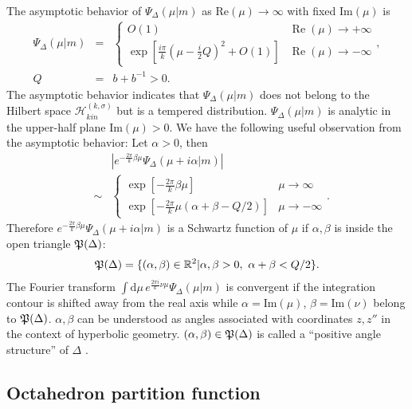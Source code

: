 \documentclass[aps,prd,notitlepage,nofootinbib,superscriptaddress,groupedaddress,twocolumn]{revtex4-1}
\def\R{\mathbb{R}}
\def\be{\begin{eqnarray}}
\def\ee{\end{eqnarray}}
\newcommand{\ch}{\mathcal H}
\renewcommand{\a}{\alpha}
\renewcommand{\b}{\beta}
\newcommand{\sig}{\sigma}
\newcommand{\rmd}{\mathrm d}
\newcommand{\lt}{\left}
\newcommand{\rt}{\right}
\begin{document}
The asymptotic behavior of $\Psi_\Delta(\mu|m)$ as $\mathrm{Re}(\mu)\to \infty$ with fixed $\mathrm{Im}(\mu)$ is
\be
\Psi_\Delta(\mu|m)&=&\begin{cases}
O(1) & \operatorname{Re}(\mu) \rightarrow+\infty \\
\exp \left[\frac{i \pi}{k}\left(\mu-\frac{i}{2} Q\right)^{2}+O(1)\right] & \operatorname{Re}(\mu) \rightarrow-\infty
\end{cases},\nonumber\\
Q&=&b+{b}^{-1}>0.
\ee
The asymptotic behavior indicates that $\Psi_\Delta(\mu|m)$ does not belong to the Hilbert space $\ch_{kin}^{(k,\sig)}$ but is a tempered distribution. $\Psi_\Delta(\mu|m)$ is analytic in the upper-half plane $\mathrm{Im}(\mu)>0$. We have the following useful observation from the asymptotic behavior: Let $\alpha>0$, then
\be
&&\left|e^{-\frac{2 \pi}{k} \beta \mu} \Psi_\Delta(\mu+i \alpha| m)\right| \nonumber\\
&\sim& \begin{cases}
	\exp\lt[ -\frac{2 \pi}{k} \beta \mu\rt] & \mu \rightarrow \infty \\
	\exp \lt[-\frac{2 \pi}{k} \mu(\alpha+\beta-{Q} / 2)\rt] & \mu \rightarrow-\infty
	\end{cases} .
\ee
Therefore $e^{-\frac{2 \pi}{k} \beta \mu} \Psi_\Delta(\mu+i \alpha| m)$ is a Schwartz function of $\mu$ if $\a,\b$ is inside the open triangle $\mathfrak{P}(\Delta)$:
\be
\Fp(\Delta)=\{(\a,\b)\in\R^2|\a,\b>0,\ \a+\b<Q/2\}.
\ee
The Fourier transform $\int\rmd \mu\,e^{\frac{2 \pi i}{k} \nu \mu} \Psi_\Delta(\mu| m)$ is convergent if the integration contour is shifted away from the real axis while $\a=\mathrm{Im}(\mu)$, $\beta=\mathrm{Im}(\nu)$ belong to $\mathfrak{P}(\Delta)$. $\a,\b$ can be understood as angles associated with coordinates $z,z''$ in the context of hyperbolic geometry. $(\a,\b)\in\Fp(\Delta)$ is called a ``positive angle structure'' of $\Delta$ \cite{levelk,Andersen2014}.




\subsection{Octahedron partition function}\label{Octahedron partition function}
\end{document}
